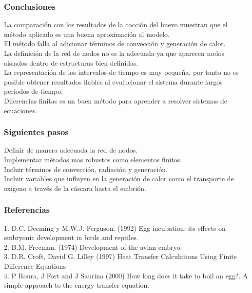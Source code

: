\documentclass[11pt]{beamer}
\begin{document}
	\begin{frame}
		\frametitle{Conclusiones}
		La comparación con los resultados de la cocción del huevo muestran que el método aplicado es una buena aproximación al modelo.\\
		
		El método falla al adicionar términos de convección y generación de calor.\\
		
		La definición de la red de nodos no es la adecuada ya que aparecen nodos aislados dentro de estructuras bien definidas.\\
		
		La representación de los intervalos de tiempo es muy pequeña, por tanto no es posible obtener resultados fiables al evolucionar el sistema durante largos periodos de tiempo.\\
		
		Diferencias finitas es un buen método para aprender a resolver sistemas de ecuaciones.\\
		
	\end{frame}

	\begin{frame}
		\frametitle{Siguientes pasos}
		Definir de manera adecuada la red de nodos.\\
		Implementar métodos mas robustos como elementos finitos.\\
		Incluir términos de convección, radiación y generación.\\
		Incluir variables que influyen en la generación de calor como el transporte de oxigeno a través de la cáscara hasta el embrión.
	\end{frame}

	\begin{frame}
		\frametitle{Referencias}
		1. D.C. Deeming y M.W.J. Ferguson. (1992) Egg incubation: its effects on embryonic development in birds and reptiles.\\
		
		
		2. B.M. Freeman. (1974) Development of the avian embryo.\\
		
		3. D.R. Croft, David G. Lilley (1997) Heat Transfer Calculations Using Finite Difference Equations\\
		
		4. P Roura, J Fort and J Saurina (2000) How long does it take to boil an egg?. A simple approach to the energy transfer equation.\\
	\end{frame}
\end{document}
